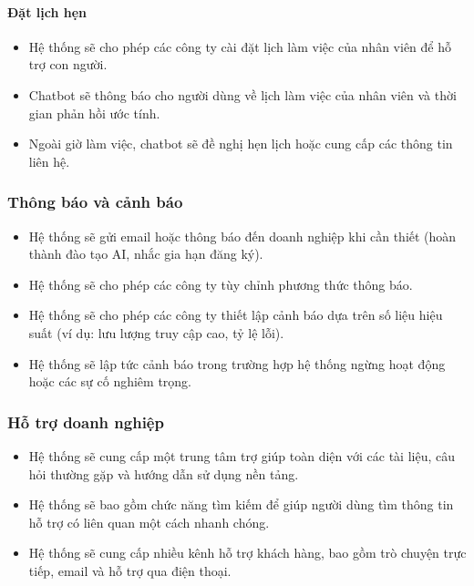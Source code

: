 \paragraph{Đặt lịch hẹn}
\begin{itemize}
    \item Hệ thống sẽ cho phép các công ty cài đặt lịch làm việc của nhân viên để hỗ trợ con người.
    \item Chatbot sẽ thông báo cho người dùng về lịch làm việc của nhân viên và thời gian phản hồi ước tính.
    \item Ngoài giờ làm việc, chatbot sẽ đề nghị hẹn lịch hoặc cung cấp các thông tin liên hệ.
\end{itemize}

\subsubsection{Thông báo và cảnh báo}

\begin{itemize}
    \item Hệ thống sẽ gửi email hoặc thông báo đến doanh nghiệp khi cần thiết (hoàn thành đào tạo AI, nhắc gia hạn đăng ký).
    \item Hệ thống sẽ cho phép các công ty tùy chỉnh phương thức thông báo.
    \item Hệ thống sẽ cho phép các công ty thiết lập cảnh báo dựa trên số liệu hiệu suất (ví dụ: lưu lượng truy cập cao, tỷ lệ lỗi).
    \item Hệ thống sẽ lập tức cảnh báo trong trường hợp hệ thống ngừng hoạt động hoặc các sự cố nghiêm trọng.
\end{itemize}

\subsubsection{Hỗ trợ doanh nghiệp}
\begin{itemize}
    \item Hệ thống sẽ cung cấp một trung tâm trợ giúp toàn diện với các tài liệu, câu hỏi thường gặp và hướng dẫn sử dụng nền tảng.
    \item Hệ thống sẽ bao gồm chức năng tìm kiếm để giúp người dùng tìm thông tin hỗ trợ có liên quan một cách nhanh chóng.
    \item Hệ thống sẽ cung cấp nhiều kênh hỗ trợ khách hàng, bao gồm trò chuyện trực tiếp, email và hỗ trợ qua điện thoại.
\end{itemize}

